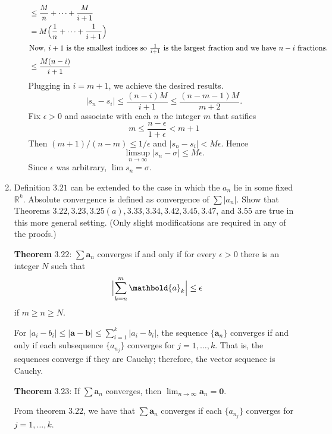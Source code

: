 \begin{enumerate}
\begin{enumerate}[label = (\alph*), ref = \theenumi{} (\alph*)]
{\begin{align*}
        & \leq \frac{M}{n} + \cdots + \frac{M}{i + 1}\\
        & = M\Bigl(\frac{1}{n} + \cdots + \frac{1}{i + 1}\Bigr)\\
        \intertext{Now, \(i + 1\) is the smallest indices so
        \(\frac{1}{i + 1}\) is the largest fraction and we have \(n - i\)
        fractions.}
        & \leq \frac{M(n - i)}{i + 1}
      \end{align*}
      Plugging in \(i = m + 1\), we achieve the desired results.
    }
    \[
    \lvert s_n - s_i\rvert\leq\frac{(n - i)M}{i + 1}\leq
    \frac{(n - m - 1)M}{m + 2}.
    \]
    Fix \(\epsilon > 0\) and associate with each \(n\) the integer \(m\) that
    satifies
    \[
    m\leq\frac{n - \epsilon}{1 + \epsilon} < m + 1
    \]
    Then \((m + 1)/(n - m)\leq 1/\epsilon\) and
    \(\lvert s_n - s_i\rvert < M\epsilon\).
    Hence
    \[
    \limsup_{n\to\infty}\lvert s_n - \sigma\rvert\leq M\epsilon.
    \]
    Since \(\epsilon\) was arbitrary, \(\lim s_n = \sigma\).
  \end{enumerate}
\item
  Definition \(3.21\) can be extended to the case in which the \(a_n\) lie in
  some fixed \(\mathbb{R}^k\).
  Absolute convergence is defined as convergence of \(\sum\lvert a_n\rvert\).
  Show that Theorems \(3.22,3.23,3.25(a),3.33,3.34,3.42,3.45,3.47\), and
  \(3.55\) are true in this more general setting.
  (Only slight modifications are required in any of the proofs.)
  \par\smallskip
  \textbf{Theorem} \(\mathbold{3.22}\): \(\sum\mathbold{a}_n\) converges if
  and only if for every \(\epsilon > 0\) there is an integer \(N\) such that
  \[
  \Bigl\lvert\sum_{k = n}^m\mathbold{a}_k\Bigr\rvert\leq\epsilon
  \]
  if \(m\geq n\geq N\).
  \par\smallskip
  For \(\lvert a_i - b_i\rvert\leq\lvert\mathbold{a} - \mathbold{b}\rvert\leq
  \sum_{i = 1}^k\lvert a_i - b_i\rvert\), the sequence \(\{\mathbold{a}_n\}\)
  converges if and only if each subsequence \(\{a_{n_j}\}\) converges for
  \(j = 1,\ldots,k\).
  That is, the sequences converge if they are Cauchy; therefore, the vector
  sequence is Cauchy.
  \par\smallskip
  \textbf{Theorem} \(\mathbold{3.23}\): If \(\sum\mathbold{a}_n\) converges,
  then \(\lim_{n\to\infty}\mathbold{a}_n = \mathbold{0}\).
  \par\smallskip
  From theorem \(3.22\), we have that \(\sum\mathbold{a}_n\) converges if each
  \(\{a_{n_j}\}\) converges for \(j = 1,\ldots,k\).

\end{enumerate}
